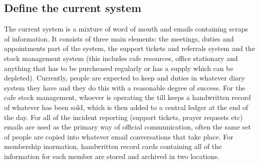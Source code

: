 \subsection{Define the current system}
	The current system is a mixture of word of mouth and emails containing scraps of information. It consists of three main elements: the meetings, duties
	and appointments part of the system, the support tickets and referrals system and the stock management system (this includes cafe resources, office
	stationary and anything that has to be purcheased regularly or has a supply which can be depleted). Currently, people are expected to keep
	and duties in whatever diary system they have and they do this with a reasonable degree of success. For the cafe stock management, whoever
	is operating the till keeps a handwritten record of whatever has been sold, which is then added to a central ledger at the end of the day.
	For all of the incident reporting (support tickets, prayer requests etc) emails are used as the primary way of official communication, often
	the same set of people are copied into whatever email conversations that take place. For membership inormation, handwritten record cards
	containing all of the information for each member are stored and archived in two locations.

